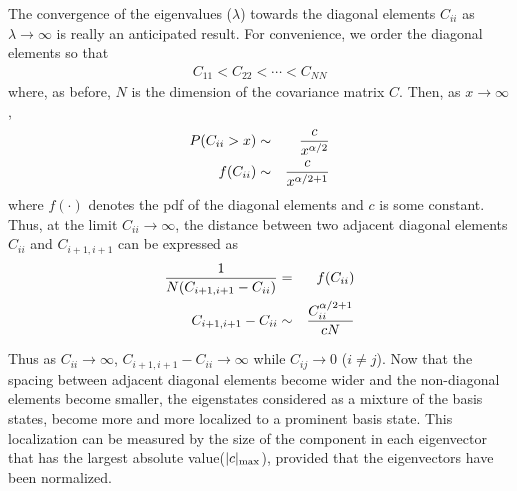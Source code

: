 \documentclass{report}
\begin{document}
The convergence of the eigenvalues ($\lambda$) towards the diagonal
elements $C_{ii}$ as $\lambda \to \infty$ is really an anticipated
result. For convenience, we order the diagonal elements so that
\begin{eqnarray*}
  C_{11} < C_{22} < \cdots < C_{NN}
\end{eqnarray*}
where, as before, $N$ is the dimension of the covariance matrix
$C$. Then, as $x \to \infty$,
\begin{eqnarray*}
  P(C_{ii} > x) &\sim& {c \over x^{\alpha/2}} \\
  f(C_{ii}) &\sim& {c \over x^{\alpha/2 + 1}} \\
\end{eqnarray*}
where $f(\cdot)$ denotes the \gls{pdf} of the diagonal elements and $c$ is
some constant. Thus, at the limit $C_{ii} \to \infty$, the distance
between two adjacent diagonal elements $C_{ii}$ and $C_{i+1, i+1}$ can
be expressed as
\begin{eqnarray*}
{1 \over N (C_{i+1, i+1} - C_{ii})} &=& f(C_{ii})\\
C_{i+1, i+1} - C_{ii} &\sim& {C_{ii}^{\alpha/2 + 1} \over c N}
\end{eqnarray*}

Thus as $C_{ii} \to \infty$, $C_{i+1, i+1} - C_{ii} \to \infty$ while
$C_{ij} \to 0$ ($i \neq j$). Now that the spacing between adjacent
diagonal elements become wider and the non-diagonal elements become
smaller, the eigenstates considered as a mixture of the basis states,
become more and more localized to a prominent basis state. This
localization can be measured by the size of the component in each
eigenvector that has the largest absolute value($|c|_{\text{max}}$), provided
that the eigenvectors have been normalized.
\end{document}
